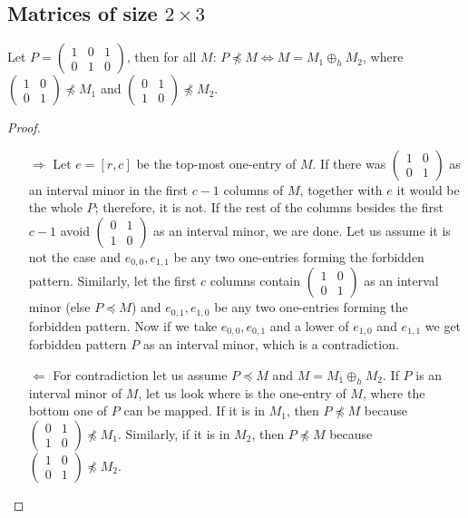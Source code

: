 \documentclass[12pt,a4paper]{report}
\begin{document}
\subsection{Matrices of size $2\times3$}
\begin{thm}
Let $P=\left(\begin{smallmatrix}1&0&1\\0&1&0\end{smallmatrix}\right)$, then for all $M$: $P\not\preceq M\Leftrightarrow M=M_1\oplus_hM_2$, where $\left(\begin{smallmatrix}1&0\\0&1\end{smallmatrix}\right)\not\preceq M_1$ and $\left(\begin{smallmatrix}0&1\\1&0\end{smallmatrix}\right)\not\preceq M_2$.
\end{thm}
\begin{proof}
\begin{itemize}
\item[$\Rightarrow$] Let $e=[r,c]$ be the top-most one-entry of $M$. If there was $\left(\begin{smallmatrix}1&0\\0&1\end{smallmatrix}\right)$ as an interval minor in the first $c-1$ columns of $M$, together with $e$ it would be the whole $P$; therefore, it is not. If the rest of the columns besides the first $c-1$ avoid $\left(\begin{smallmatrix}0&1\\1&0\end{smallmatrix}\right)$ as an interval minor, we are done. Let us assume it is not the case and $e_{0,0},e_{1,1}$ be any two one-entries forming the forbidden pattern. Similarly, let the first $c$ columns contain $\left(\begin{smallmatrix}1&0\\0&1\end{smallmatrix}\right)$ as an interval minor (else $P\preceq M$) and $e_{0,1},e_{1,0}$ be any two one-entries forming the forbidden pattern. Now if we take $e_{0,0},e_{0,1}$ and a lower of $e_{1,0}$ and $e_{1,1}$ we get forbidden pattern $P$ as an interval minor, which is a contradiction. 
\item[$\Leftarrow$] For contradiction let us assume $P\preceq M$ and $M=M_1\oplus_hM_2$. If $P$ is an interval minor of $M$, let us look where is the one-entry of $M$, where the bottom one of $P$ can be mapped. If it is in $M_1$, then $P\not\preceq M$ because $\left(\begin{smallmatrix}0&1\\1&0\end{smallmatrix}\right)\not\preceq M_1$. Similarly, if it is in $M_2$, then $P\not\preceq M$ because $\left(\begin{smallmatrix}1&0\\0&1\end{smallmatrix}\right)\not\preceq M_2$.
\end{itemize}
\end{proof}
\end{document}
